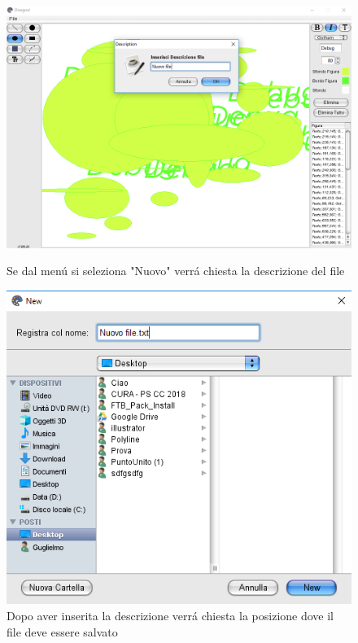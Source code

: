 \documentclass[a4paper,12pt,times,numbered,print,index]{article}
\begin{document}
\begin{figure}
  \includegraphics[scale=.5]{Immagini/Debug/test2.png}
  \caption[Nuovo file]{Se dal menú si seleziona "Nuovo" verrá chiesta la descrizione del file}
   \includegraphics[scale=.8]{Immagini/Debug/test3.png}
  \caption[Nuovo file]{Dopo aver inserita la descrizione verrá chiesta la posizione dove il file deve essere salvato}
\end{figure}
\end{document}
